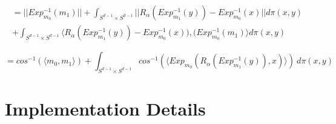 \documentclass[]{article}
\begin{document}
\begin{multline}
	= ||Exp_{m_0}^{-1}(m_1)||+ \int_{S^{d-1} \times S^{d-1}} ||R_\alpha(Exp_{m_1}^{-1}(y)) - Exp_{m_0}^{-1}(x)|| d\pi(x,y) \\
	+ \int_{S^{d-1} \times S^{d-1}} \big\langle R_\alpha(Exp_{m_1}^{-1}(y)) - Exp_{m_0}^{-1}(x)), (Exp_{m_0}^{-1}(m_1)\big\rangle d\pi(x,y)
\end{multline}

\begin{equation}
 = cos^{-1}(\langle m_0,m_1\rangle) + \int_{S^{d-1} \times S^{d-1}} cos^{-1}(\langle Exp_{m_0}(R_\alpha(Exp_{m_1}^{-1}(y)), x)\rangle) \ d\pi(x,y)
\end{equation}



\newpage

%
%
%
%
%
%



%
%
%
%
%
%



\section{Implementation Details}



\cite{https://doi.org/10.48550/arxiv.1907.05254}
\cite{https://doi.org/10.48550/arxiv.0801.2250}
\cite{10.1307/mmj/1029003026}
\cite{COTFNT}
\end{document}
